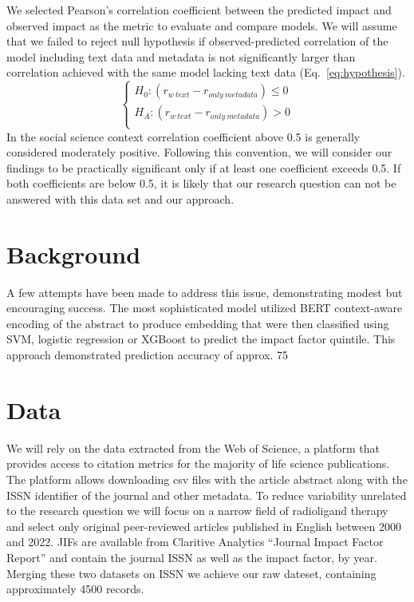 \documentclass[11pt]{article}
\begin{document}
We selected Pearson's correlation coefficient between the predicted impact and observed impact as the metric to evaluate and compare models. We will assume that we failed to reject null hypothesis if observed-predicted correlation of the model including text data and metadata is not significantly larger than correlation achieved with the same model lacking text data (Eq.~\ref{eq:hypothesis}).
\begin{equation}\label{eq:hypothesis}
	\begin{cases}
		H_{0}: (r_{w\ text} - r_{only\ metadata}) \leq 0 \\
		H_{A}: (r_{w\ text} - r_{only\ metadata}) > 0\\
	\end{cases}       
\end{equation}
In the social science context correlation coefficient above 0.5 is generally considered moderately positive\citep{KahnemanDaniel2021N:af}. Following this convention, we will consider our findings to be practically significant only if at least one coefficient exceeds 0.5. If both coefficients are below 0.5, it is likely that our research question can not be answered with this data set and our approach. 

\section{Background}
A few attempts have been made to address this issue, demonstrating modest but encouraging success. \citep{Macri2023-tr, Alohali2022-no, 10.1162/qss_a_00258, doi:10.1152/japplphysiol.00489.2020} The most sophisticated model utilized BERT context-aware encoding of the abstract to produce embedding that were then classified using  SVM, logistic regression or XGBoost to predict the impact factor quintile. This approach demonstrated prediction accuracy of approx. 75%

\section{Data}
We will rely on the data extracted from the Web of Science, a platform that provides access to citation metrics for the majority of life science publications. The platform allows downloading csv files with the article abstract along with the ISSN identifier of the journal and other metadata. To reduce variability unrelated to the research question we will focus on a narrow field of radioligand therapy and select only original peer-reviewed articles published in English between 2000 and 2022. JIFs are available from Claritive Analytics “Journal Impact Factor Report” and contain the journal ISSN as well as the impact factor, by year. Merging these two datasets on ISSN we achieve our raw dateset, containing approximately 4500 records.
\end{document}
